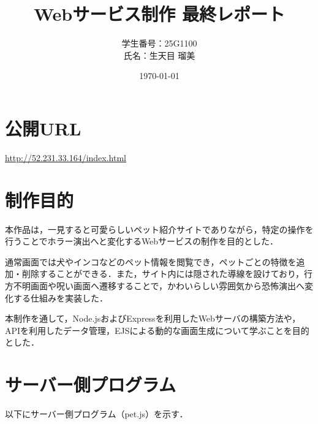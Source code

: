 \documentclass[a4paper,12pt]{ltjsarticle}
\title{Webサービス制作 最終レポート}
\author{
学生番号：25G1100\\
氏名：生天目 瑠美
}
\date{\today}
\begin{document}
\maketitle

\section{公開URL}

\url{http://52.231.33.164/index.html}

\section{制作目的}

本作品は，一見すると可愛らしいペット紹介サイトでありながら，特定の操作を行うことでホラー演出へと変化するWebサービスの制作を目的とした．

通常画面では犬やインコなどのペット情報を閲覧でき，ペットごとの特徴を追加・削除することができる．また，サイト内には隠された導線を設けており，行方不明画面や呪い画面へ遷移することで，かわいらしい雰囲気から恐怖演出へ変化する仕組みを実装した．

本制作を通して，Node.jsおよびExpressを利用したWebサーバの構築方法や，APIを利用したデータ管理，EJSによる動的な画面生成について学ぶことを目的とした．

\section{サーバー側プログラム}

以下にサーバー側プログラム（pet.js）を示す．
\end{document}
